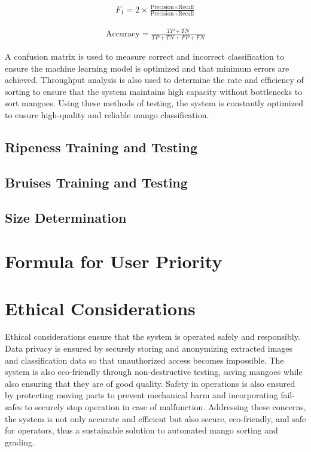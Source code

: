 \begin{eqnarray}
	F_1 = 2\times \frac{\text{Precision} \times \text{Recall}}{\text{Precision} + \text{Recall}}
	\label{eq:f1_score}
\end{eqnarray}

\begin{eqnarray}
	\text{Accuracy} = \frac{TP + TN}{TP + TN + FP + FN}
	\label{eq:accuracy}
\end{eqnarray}

A confusion matrix is used to measure correct and incorrect classification to ensure the machine learning model is optimized and that minimum errors are achieved. Throughput analysis is also used to determine the rate and efficiency of sorting to ensure that the system maintains high capacity without bottlenecks to sort mangoes. Using these methods of testing, the system is constantly optimized to ensure high-quality and reliable mango classification.

\subsection{Ripeness Training and Testing} \label{sec:ripenesstraining}

\subsection{Bruises Training and Testing} \label{sec:bruisestraining}

\subsection{Size Determination} \label{sec:sizeDetermination}

\section{Formula for User Priority} \label{sec:formula}

\section{Ethical Considerations}
Ethical considerations ensure that the system is operated safely and responsibly. Data privacy is ensured by securely storing and anonymizing extracted images and classification data so that unauthorized access becomes impossible. The system is also eco-friendly through non-destructive testing, saving mangoes while also ensuring that they are of good quality. Safety in operations is also ensured by protecting moving parts to prevent mechanical harm and incorporating fail-safes to securely stop operation in case of malfunction. Addressing these concerns, the system is not only accurate and efficient but also secure, eco-friendly, and safe for operators, thus a sustainable solution to automated mango sorting and grading.

